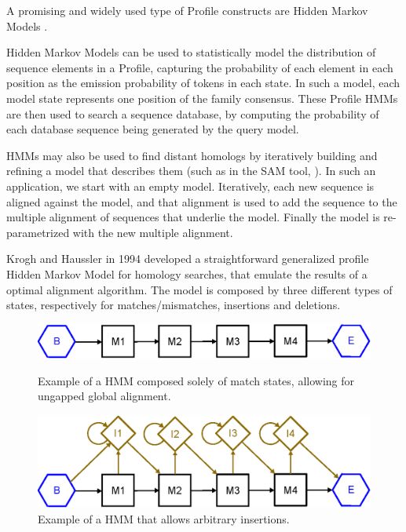 A promising and widely used type of Profile constructs are Hidden Markov Models \cite{hmms}. 

Hidden Markov Models can be used to statistically model the distribution of sequence elements in a Profile, capturing the probability of each element in each position as the emission probability of tokens in each state. In such a model, each model state represents one position of the family consensus.
These Profile HMMs are then used to search a sequence database, by computing the probability of each database sequence being generated by the query model.

HMMs may also be used to find distant homologs by iteratively building and refining a model that describes them (such as in the SAM tool, \cite{sam}). In such an application, we start with an empty model. Iteratively,  each new sequence is aligned against the model, and that alignment is used to add the sequence to the multiple alignment of sequences that underlie the model. Finally the model is re-parametrized with the new multiple alignment.

Krogh and Haussler in 1994 \cite{krogh1994} developed a straightforward generalized profile Hidden Markov Model for homology searches, that emulate the results of a optimal alignment algorithm. The model is composed by three different types of states, respectively for matches/mismatches, insertions and deletions.

\begin{figure}[htb!]
	\begin{minipage}{0.48\linewidth}
		\centering
		\includegraphics[scale=0.5]{img-hmm/model-construction-matches.eps}
		\caption[HMM for ungapped global alignment] {Example of a HMM composed solely of match states, allowing for ungapped global alignment.}
		\label{model-construction-matches}
	\end{minipage}
	\hspace{0.04\linewidth}
	\begin{minipage}{0.48\linewidth}
		\centering
		\includegraphics[scale=0.5]{img-hmm/model-construction-inserts.eps}
		\caption[HMM with Insert gaps] {Example of a HMM that allows arbitrary insertions. }
		\label{model-construction-inserts}
	\end{minipage}
\end{figure} 

